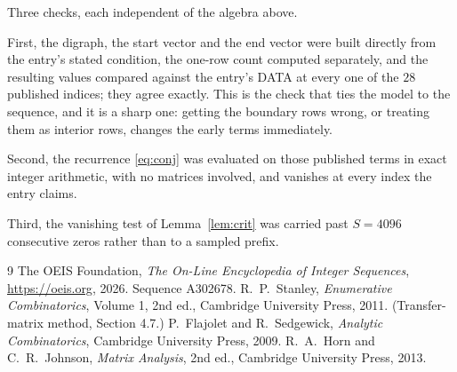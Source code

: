 \documentclass[11pt,a4paper]{article}
\theoremstyle{plain}
\theoremstyle{definition}
\begin{document}
Three checks, each independent of the algebra above.

First, the digraph, the start vector and the end vector were built directly from the
entry's stated condition, the one-row count computed separately, and the resulting values
compared against the entry's DATA at every one of the $28$ published indices; they
agree exactly. This is the check that ties the model to the sequence, and it is a sharp one:
getting the boundary rows wrong, or treating them as interior rows, changes the early terms
immediately.

Second, the recurrence \eqref{eq:conj} was evaluated on those published terms in exact
integer arithmetic, with no matrices involved, and vanishes at every index the entry claims.

Third, the vanishing test of Lemma~\ref{lem:crit} was carried past $S=4096$ consecutive
zeros rather than to a sampled prefix.

\begin{thebibliography}{9}
 The OEIS Foundation, \emph{The On-Line Encyclopedia of Integer
Sequences}, \url{https://oeis.org}, 2026. Sequence A302678.
 R.~P.~Stanley, \emph{Enumerative Combinatorics}, Volume 1, 2nd ed.,
Cambridge University Press, 2011. (Transfer-matrix method, Section 4.7.)
 P.~Flajolet and R.~Sedgewick, \emph{Analytic Combinatorics}, Cambridge
University Press, 2009.
 R.~A.~Horn and C.~R.~Johnson, \emph{Matrix Analysis}, 2nd ed., Cambridge
University Press, 2013.
\end{thebibliography}
\end{document}
